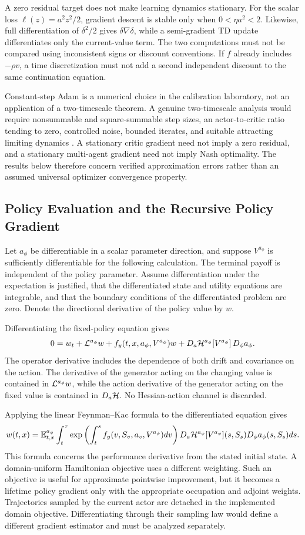 A zero residual target does not make learning dynamics stationary. For the scalar loss $\ell(z)=a^2z^2/2$, gradient descent is stable only when $0<\eta a^2<2$. Likewise, full differentiation of $\delta^2/2$ gives $\delta\nabla\delta$, while a semi-gradient TD update differentiates only the current-value term. The two computations must not be compared using inconsistent signs or discount conventions. If $f$ already includes $-\rho v$, a time discretization must not add a second independent discount to the same continuation equation.

Constant-step Adam is a numerical choice in the calibration laboratory, not an application of a two-timescale theorem. A genuine two-timescale analysis would require nonsummable and square-summable step sizes, an actor-to-critic ratio tending to zero, controlled noise, bounded iterates, and suitable attracting limiting dynamics \citep{borkar2024}. A stationary critic gradient need not imply a zero residual, and a stationary multi-agent gradient need not imply Nash optimality. The results below therefore concern verified approximation errors rather than an assumed universal optimizer convergence property.

\subsection{Policy Evaluation and the Recursive Policy Gradient}
Let $a_\phi$ be differentiable in a scalar parameter direction, and suppose $V^{a_\phi}$ is sufficiently differentiable for the following calculation. The terminal payoff is independent of the policy parameter. Assume differentiation under the expectation is justified, that the differentiated state and utility equations are integrable, and that the boundary conditions of the differentiated problem are zero. Denote the directional derivative of the policy value by $w$.

Differentiating the fixed-policy equation gives
\[
 0=w_t+\mathcal L^{a_\phi}w+f_y(t,x,a_\phi,V^{a_\phi})w
  +D_a\mathcal H^{a_\phi}[V^{a_\phi}]\,D_\phi a_\phi.
\]
The operator derivative includes the dependence of both drift and covariance on the action. The derivative of the generator acting on the changing value is contained in $\mathcal L^{a_\phi}w$, while the action derivative of the generator acting on the fixed value is contained in $D_a\mathcal H$. No Hessian-action channel is discarded.

Applying the linear Feynman--Kac formula to the differentiated equation gives
\[
 w(t,x)=\mathbb E_{t,x}^{a_\phi}\int_t^\tau
 \exp\left(\int_t^s f_y(v,S_v,a_v,V^{a_\phi})dv\right)
 D_a\mathcal H^{a_\phi}[V^{a_\phi}](s,S_s)D_\phi a_\phi(s,S_s)ds.
\]
This formula concerns the performance derivative from the stated initial state. A domain-uniform Hamiltonian objective uses a different weighting. Such an objective is useful for approximate pointwise improvement, but it becomes a lifetime policy gradient only with the appropriate occupation and adjoint weights. Trajectories sampled by the current actor are detached in the implemented domain objective. Differentiating through their sampling law would define a different gradient estimator and must be analyzed separately.

